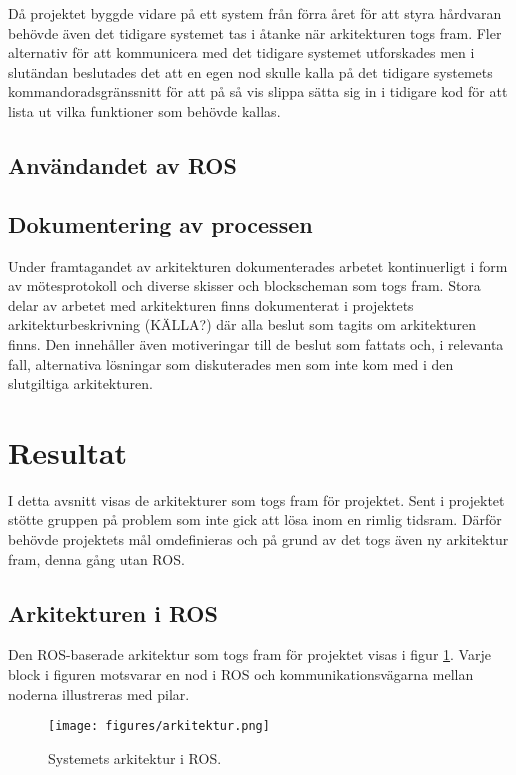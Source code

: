 Då projektet byggde vidare på ett system från förra året för att styra hårdvaran behövde även det tidigare systemet tas i åtanke när arkitekturen togs fram. Fler alternativ för att kommunicera med det tidigare systemet utforskades men i slutändan beslutades det att en egen nod skulle kalla på det tidigare systemets kommandoradsgränssnitt för att på så vis slippa sätta sig in i tidigare kod för att lista ut vilka funktioner som behövde kallas.

\subsection{Användandet av ROS}

\subsection{Dokumentering av processen}
Under framtagandet av arkitekturen dokumenterades arbetet kontinuerligt i form av mötesprotokoll och diverse skisser och blockscheman som togs fram. Stora delar av arbetet med arkitekturen finns dokumenterat i projektets arkitekturbeskrivning (KÄLLA?) där alla beslut som tagits om arkitekturen finns. Den innehåller även motiveringar till de beslut som fattats och, i relevanta fall, alternativa lösningar som diskuterades men som inte kom med i den slutgiltiga arkitekturen.


\section{Resultat}
\label{sec:results-lundberg}

I detta avsnitt visas de arkitekturer som togs fram för projektet. Sent i projektet stötte gruppen på problem som inte gick att lösa inom en rimlig tidsram. Därför behövde projektets mål omdefinieras och på grund av det togs även ny arkitektur fram, denna gång utan ROS.

\subsection{Arkitekturen i ROS}
Den ROS-baserade arkitektur som togs fram för projektet visas i figur \ref{fig:arkitektur}. Varje block i figuren motsvarar en nod i ROS och kommunikationsvägarna mellan noderna illustreras med pilar.

\begin{figure}[h]
	\centering
	\texttt{[image: figures/arkitektur.png]}
	\caption{Systemets arkitektur i ROS.}
	\label{fig:arkitektur}
\end{figure}

